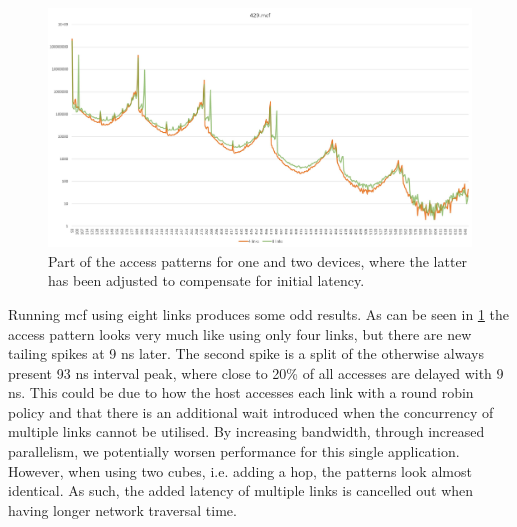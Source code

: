 \begin{figure}[!h]
    \centering
    \includegraphics[width=1.0\linewidth]{figure/429-2.4-8.jpg}
    \caption{Part of the access patterns for one and two devices, where the latter has been adjusted to compensate for initial latency.}
    \label{Memory-access-429-link-compare}
\end{figure}

Running mcf using eight links produces some odd results. As can be seen in \ref{Memory-access-429-link-compare} the access pattern looks very much like using only four links, but there are new tailing spikes at 9 ns later. The second spike is a split of the otherwise always present 93 ns interval peak, where close to 20\% of all accesses are delayed with 9 ns. This could be due to how the host accesses each link with a round robin policy and that there is an additional wait introduced when the concurrency of multiple links cannot be utilised. By increasing bandwidth, through increased parallelism, we potentially worsen performance for this single application. However, when using two cubes, i.e. adding a hop, the patterns look almost identical. As such, the added latency of multiple links is cancelled out when having longer network traversal time.



